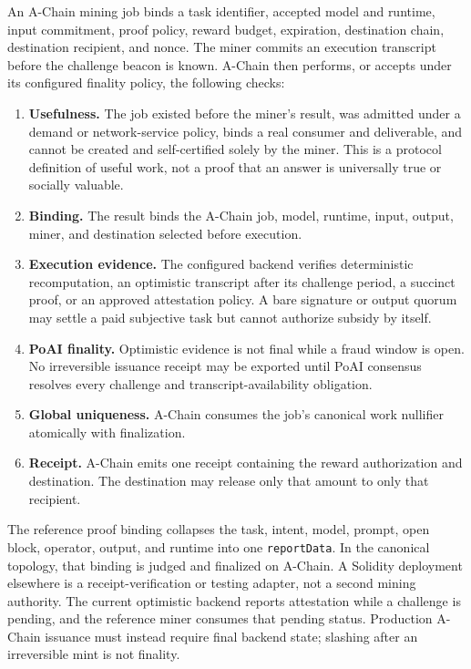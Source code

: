 \documentclass[11pt,a4paper]{article}
\begin{document}
An A-Chain mining job binds a task identifier, accepted model and runtime, input commitment, proof policy, reward budget, expiration, destination chain, destination recipient, and nonce. The miner commits an execution transcript before the challenge beacon is known. A-Chain then performs, or accepts under its configured finality policy, the following checks:
\begin{enumerate}
  \item \textbf{Usefulness.} The job existed before the miner's result, was admitted under a demand or network-service policy, binds a real consumer and deliverable, and cannot be created and self-certified solely by the miner. This is a protocol definition of useful work, not a proof that an answer is universally true or socially valuable.
  \item \textbf{Binding.} The result binds the A-Chain job, model, runtime, input, output, miner, and destination selected before execution.
  \item \textbf{Execution evidence.} The configured backend verifies deterministic recomputation, an optimistic transcript after its challenge period, a succinct proof, or an approved attestation policy. A bare signature or output quorum may settle a paid subjective task but cannot authorize subsidy by itself.
  \item \textbf{PoAI finality.} Optimistic evidence is not final while a fraud window is open. No irreversible issuance receipt may be exported until PoAI consensus resolves every challenge and transcript-availability obligation.
  \item \textbf{Global uniqueness.} A-Chain consumes the job's canonical work nullifier atomically with finalization.
  \item \textbf{Receipt.} A-Chain emits one receipt containing the reward authorization and destination. The destination may release only that amount to only that recipient.
\end{enumerate}

The reference proof binding collapses the task, intent, model, prompt, open block, operator, output, and runtime into one \texttt{reportData}. In the canonical topology, that binding is judged and finalized on A-Chain. A Solidity deployment elsewhere is a receipt-verification or testing adapter, not a second mining authority. The current optimistic backend reports attestation while a challenge is pending, and the reference miner consumes that pending status. Production A-Chain issuance must instead require final backend state; slashing after an irreversible mint is not finality.
\end{document}
